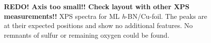 \begin{figure}[ht]
\centering
{}
\caption{\textbf{REDO! Axis too small!! Check layout with other XPS measurements!!} XPS spectra for ML \textit{h}-BN/Cu-foil. The peaks are at their expected positions\cite{kidambi_situ_2014} and show no additional features. No remnants of sulfur or remaining oxygen could be found.}
\label{fig:xps-self-grown}
\end{figure}

